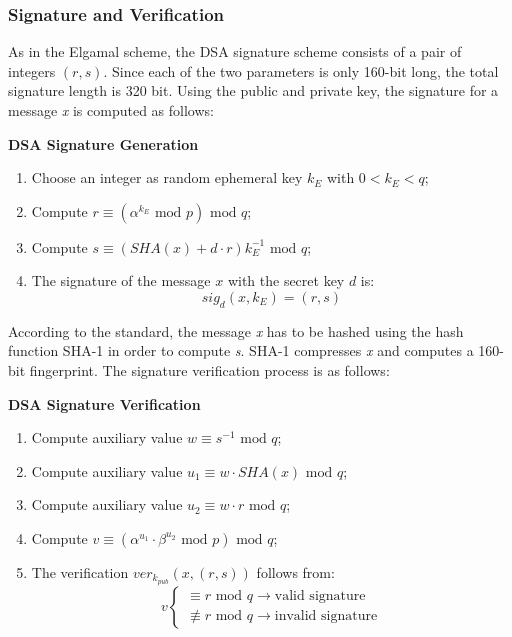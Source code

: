\documentclass[11pt, a4paper]{article}
\newcommand{\mymod}{
    \text{ mod }
}
\begin{document}
\subsubsection*{Signature and Verification}
As in the Elgamal scheme, the DSA signature scheme consists of a pair of integers $(r,s)$. Since each of the two parameters is only 160-bit long, the total signature length is 320 bit. Using the public and private key, the signature for a message \textit{x} is computed as follows:
\begin{framed}
    \hfill\break\textbf{DSA Signature Generation}
    \begin{enumerate}
        \item Choose an integer as random ephemeral key $k_E$ with $0<k_E<q$;
        \item Compute $r\equiv(\alpha^{k_E}\mymod p)\mymod q$;
        \item Compute $s\equiv(SHA(x)+d\cdot r)k_E^{-1}\mymod q$;
        \item The signature of the message $x$ with the secret key $d$ is:
        $$sig_d(x,k_E)=(r,s)$$
    \end{enumerate}
\end{framed}
According to the standard, the message \textit{x} has to be hashed using the hash function SHA-1 in order to compute \textit{s}. SHA-1 compresses \textit{x} and computes a 160-bit fingerprint. The signature verification process is as follows:
\begin{framed}
    \hfill\break\textbf{DSA Signature Verification}
    \begin{enumerate}
        \item Compute auxiliary value $w\equiv s^{-1}\mymod q$;
        \item Compute auxiliary value $u_1\equiv w\cdot SHA(x)\mymod q$;
        \item Compute auxiliary value $u_2\equiv w\cdot r\mymod q$;
        \item Compute $v\equiv(\alpha^{u_1}\cdot \beta^{u_2}\mymod p)\mymod q$;
        \item The verification $ver_{k_{pub}}(x,(r,s))$ follows from:
        \begin{equation*}
            v\begin{cases}
                \equiv r\mymod q\longrightarrow\text{valid signature}\\
                \not\equiv r\mymod q \longrightarrow\text{invalid signature}
            \end{cases}
        \end{equation*}
    \end{enumerate}
\end{framed}
\end{document}
